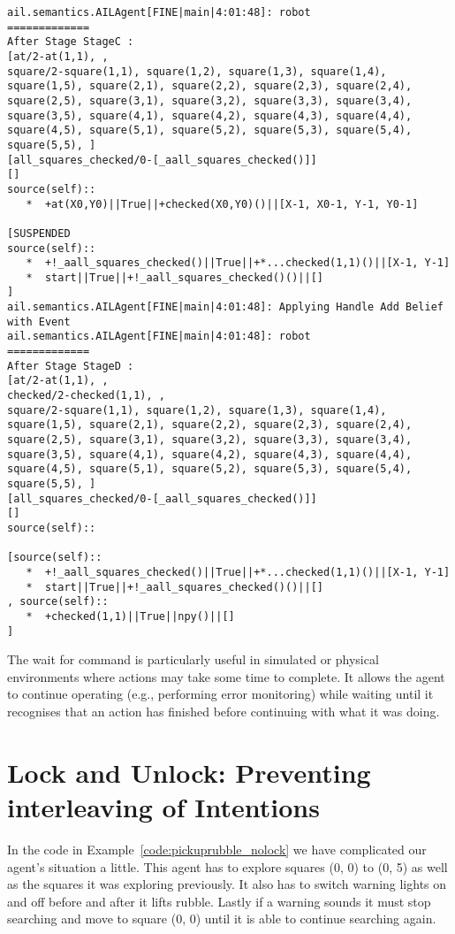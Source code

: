 \begin{verbatim}
ail.semantics.AILAgent[FINE|main|4:01:48]: robot
=============
After Stage StageC :
[at/2-at(1,1), , 
square/2-square(1,1), square(1,2), square(1,3), square(1,4), square(1,5), square(2,1), square(2,2), square(2,3), square(2,4), square(2,5), square(3,1), square(3,2), square(3,3), square(3,4), square(3,5), square(4,1), square(4,2), square(4,3), square(4,4), square(4,5), square(5,1), square(5,2), square(5,3), square(5,4), square(5,5), ]
[all_squares_checked/0-[_aall_squares_checked()]]
[]
source(self):: 
   *  +at(X0,Y0)||True||+checked(X0,Y0)()||[X-1, X0-1, Y-1, Y0-1]

[SUSPENDED
source(self):: 
   *  +!_aall_squares_checked()||True||+*...checked(1,1)()||[X-1, Y-1]
   *  start||True||+!_aall_squares_checked()()||[]
] 
ail.semantics.AILAgent[FINE|main|4:01:48]: Applying Handle Add Belief with Event 
ail.semantics.AILAgent[FINE|main|4:01:48]: robot
=============
After Stage StageD :
[at/2-at(1,1), , 
checked/2-checked(1,1), , 
square/2-square(1,1), square(1,2), square(1,3), square(1,4), square(1,5), square(2,1), square(2,2), square(2,3), square(2,4), square(2,5), square(3,1), square(3,2), square(3,3), square(3,4), square(3,5), square(4,1), square(4,2), square(4,3), square(4,4), square(4,5), square(5,1), square(5,2), square(5,3), square(5,4), square(5,5), ]
[all_squares_checked/0-[_aall_squares_checked()]]
[]
source(self):: 

[source(self):: 
   *  +!_aall_squares_checked()||True||+*...checked(1,1)()||[X-1, Y-1]
   *  start||True||+!_aall_squares_checked()()||[]
, source(self):: 
   *  +checked(1,1)||True||npy()||[]
] 
\end{verbatim}

The wait for command is particularly useful in simulated or physical environments where actions may take some time to complete.  It allows the agent to continue operating (e.g., performing error monitoring) while waiting until it recognises that an action has finished before continuing with what it was doing.


\section{Lock and Unlock: Preventing interleaving of Intentions}
In the code in Example~\ref{code:pickuprubble_nolock} we have complicated our agent's situation a little.  This agent has to explore squares (0, 0) to (0, 5) as well as the squares it was exploring previously.  It also has to switch warning lights on and off before and after it lifts rubble.  Lastly if a warning sounds it must stop searching and move to square (0, 0) until it is able to continue searching again.

